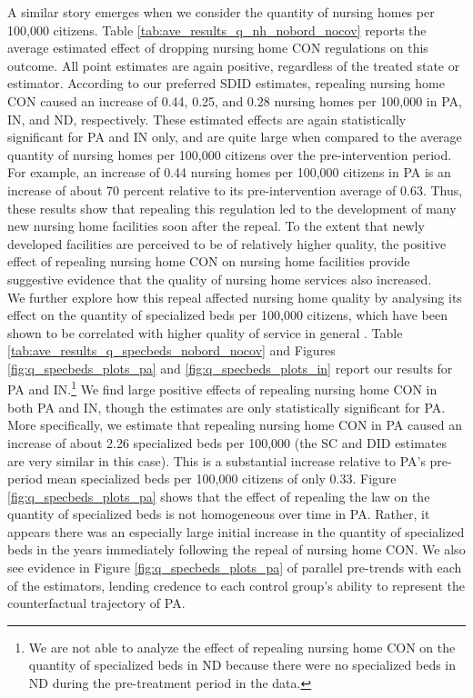 \documentclass[../Main.tex]{subfiles}
\begin{document}
\indent A similar story emerges when we consider the quantity of nursing homes per 100,000 citizens. Table \ref{tab:ave_results_q_nh_nobord_nocov} reports the average estimated effect of dropping nursing home CON regulations on this outcome. All point estimates are again positive, regardless of the treated state or estimator. According to our preferred SDID estimates, repealing nursing home CON caused an increase of 0.44, 0.25, and 0.28 nursing homes per 100,000 in PA, IN, and ND, respectively. These estimated effects are again statistically significant for PA and IN only, and are quite large when compared to the average quantity of nursing homes per 100,000 citizens over the pre-intervention period. For example, an increase of 0.44 nursing homes per 100,000 citizens in PA is an increase of about 70 percent relative to its pre-intervention average of 0.63. Thus, these results show that repealing this regulation led to the development of many new nursing home facilities soon after the repeal. To the extent that newly developed facilities are perceived to be of relatively higher quality, the positive effect of repealing nursing home CON on nursing home facilities provide suggestive evidence that the quality of nursing home services also increased.\\
\indent We further explore how this repeal affected nursing home quality by analysing its effect on the quantity of specialized beds per 100,000 citizens, which have been shown to be correlated with higher quality of service in general \citep{grabowski2010quality}. Table \ref{tab:ave_results_q_specbeds_nobord_nocov} and Figures \ref{fig:q_specbeds_plots_pa} and \ref{fig:q_specbeds_plots_in} report our results for PA and IN.\footnote{We are not able to analyze the effect of repealing nursing home CON on the quantity of specialized beds in ND because there were no specialized beds in ND during the pre-treatment period in the data.} We find large positive effects of repealing nursing home CON in both PA and IN, though the estimates are only statistically significant for PA. More specifically, we estimate that repealing nursing home CON in PA caused an increase of about 2.26 specialized beds per 100,000 (the SC and DID estimates are very similar in this case). This is a substantial increase relative to PA's pre-period mean specialized beds per 100,000 citizens of only 0.33. Figure \ref{fig:q_specbeds_plots_pa} shows that the effect of repealing the law on the quantity of specialized beds is not homogeneous over time in PA. Rather, it appears there was an especially large initial increase in the quantity of specialized beds in the years immediately following the repeal of nursing home CON. We also see evidence in Figure \ref{fig:q_specbeds_plots_pa} of parallel pre-trends with each of the estimators, lending credence to each control group's ability to represent the counterfactual trajectory of PA.\\
\end{document}

